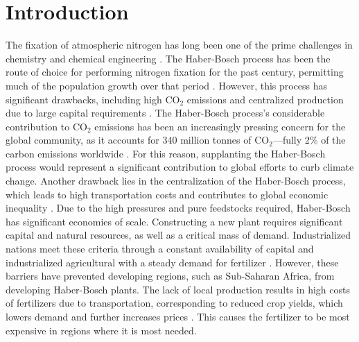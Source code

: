 \section{Introduction}
The fixation of atmospheric nitrogen has long been one of the prime challenges in chemistry and chemical engineering \cite{ritter_18, Schloegl_2003}. The Haber-Bosch process has been the route of choice for performing nitrogen fixation for the past century, permitting much of the population growth over that period \cite{Smil_1999}. However, this process has significant drawbacks, including high CO$_2$ emissions and centralized production due to large capital requirements \cite{Comer_2019}. The Haber-Bosch process's considerable contribution to CO$_2$ emissions has been an increasingly pressing concern for the global community, as it accounts for 340 million tonnes of CO$_2$---fully 2\% of the carbon emissions worldwide \cite{gross_12, Schiffer_2017}. For this reason, supplanting the Haber-Bosch process would represent a significant contribution to global efforts to curb climate change. Another drawback lies in the centralization of the Haber-Bosch process, which leads to high transportation costs and contributes to global economic inequality \cite{Comer_2019}.  Due to the high pressures and pure feedstocks required, Haber-Bosch has significant economies of scale. Constructing a new plant requires significant capital and natural resources, as well as a critical mass of demand. Industrialized nations meet these criteria through a constant availability of capital and industrialized agricultural with a steady demand for fertilizer \cite{McArthur_2017}. However, these barriers have prevented developing regions, such as Sub-Saharan Africa, from developing Haber-Bosch plants. The lack of local production results in high costs of fertilizers due to transportation, corresponding to reduced crop yields, which lowers demand and further increases prices \cite{IFDC_2012}. This causes the fertilizer to be most expensive in regions where it is most needed.

